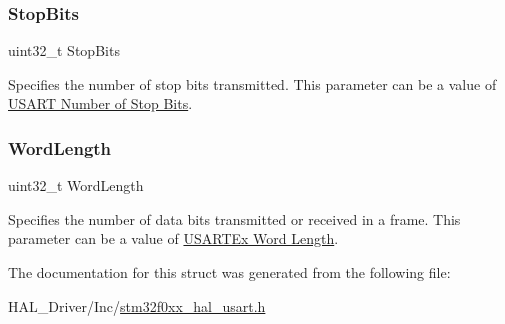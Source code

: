 \subsubsection{\texorpdfstring{Stop\+Bits}{StopBits}}
{\footnotesize\ttfamily uint32\+\_\+t Stop\+Bits}

Specifies the number of stop bits transmitted. This parameter can be a value of \hyperlink{group___u_s_a_r_t___stop___bits}{U\+S\+A\+RT Number of Stop Bits}. \mbox{\label{struct_u_s_a_r_t___init_type_def_ae5e60b9a021fe0009588fc86c7584a5a}} 
\subsubsection{\texorpdfstring{Word\+Length}{WordLength}}
{\footnotesize\ttfamily uint32\+\_\+t Word\+Length}

Specifies the number of data bits transmitted or received in a frame. This parameter can be a value of \hyperlink{group___u_s_a_r_t_ex___word___length}{U\+S\+A\+R\+T\+Ex Word Length}. 

The documentation for this struct was generated from the following file\+:\begin{DoxyCompactItemize}
\item 
H\+A\+L\+\_\+\+Driver/\+Inc/\hyperlink{stm32f0xx__hal__usart_8h}{stm32f0xx\+\_\+hal\+\_\+usart.\+h}\end{DoxyCompactItemize}
